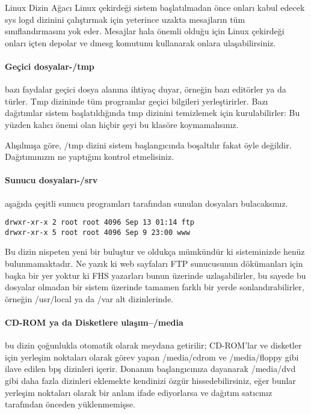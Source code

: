 \begin{section}{Linux Dizin Ağacı}
Linux çekirdeği  sistem başlatılmadan önce onları kabul edecek sys logd dizinini çalıştırmak için yeterince uzakta mesajların tüm sınıflandırmasını yok eder. Mesajlar hala önemli olduğu için Linux çekirdeği onları içten depolar ve dmesg komutunu kullanarak onlara ulaşabilirsiniz.

\paragraph{Geçici dosyalar-/tmp}{bazı faydalar geçici dosya alanına ihtiyaç duyar, örneğin bazı editörler ya da türler. Tmp dizininde tüm programlar geçici bilgileri yerleştirirler. Bazı dağıtımlar sistem başlatıldığında tmp dizinini temizlemek için kurulabilirler: Bu yüzden kalıcı önemi olan hiçbir şeyi bu klasöre koymamalısınız.}

Alışılmışa göre, /tmp dizini sistem başlangıcında boşaltılır fakat öyle değildir. Dağıtımınızın ne yaptığını kontrol etmelisiniz.

\paragraph{Sunucu dosyaları-/srv}{ aşağıda çeşitli sunucu programları tarafından sunulan dosyaları bulacaksınız.}
\begin{verbatim}
drwxr-xr-x 2 root root 4096 Sep 13 01:14 ftp
drwxr-xr-x 5 root root 4096 Sep 9 23:00 www
\end{verbatim}

Bu dizin nispeten yeni bir buluştur ve oldukça mümkündür ki sisteminizde henüz bulunmamaktadır. Ne yazık ki web sayfaları FTP sunucusunun dökümanları için başka bir yer yoktur ki FHS yazarları bunun üzerinde uzlaşabilirler, bu sayede bu dosyalar olmadan bir sistem üzerinde tamamen farklı bir yerde sonlandırabilirler, örneğin /usr/local ya da /var alt dizinlerinde.

\paragraph{CD-ROM ya da Disketlere ulaşım--/media}{bu dizin çoğunlukla otomatik olarak meydana getirilir; CD-ROM’lar ve disketler için yerleşim noktaları olarak görev yapan /media/cdrom ve /media/floppy gibi ilave edilen bpş dizinleri içerir. Donanım başlangıcınıza dayanarak /media/dvd gibi daha fazla dizinleri eklemekte kendinizi özgür hissedebilirsiniz, eğer bunlar yerleşim noktaları olarak bir anlam ifade ediyorlarsa ve dağıtım satıcınız tarafından önceden yüklenmemişse.}


\end{section}
